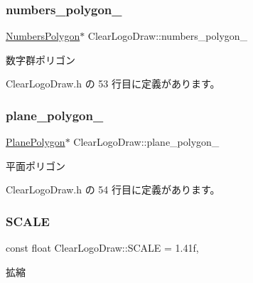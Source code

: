 \subsubsection{\texorpdfstring{numbers\+\_\+polygon\+\_\+}{numbers\_polygon\_}}
{\footnotesize\ttfamily \mbox{\hyperlink{class_numbers_polygon}{Numbers\+Polygon}}$\ast$ Clear\+Logo\+Draw\+::numbers\+\_\+polygon\+\_\+\hspace{0.3cm}{\ttfamily [private]}}



数字群ポリゴン 



 Clear\+Logo\+Draw.\+h の 53 行目に定義があります。

\mbox{\label{class_clear_logo_draw_a8d5fe46bbb3bf445ca322555853cf60a}} 
\subsubsection{\texorpdfstring{plane\+\_\+polygon\+\_\+}{plane\_polygon\_}}
{\footnotesize\ttfamily \mbox{\hyperlink{class_plane_polygon}{Plane\+Polygon}}$\ast$ Clear\+Logo\+Draw\+::plane\+\_\+polygon\+\_\+\hspace{0.3cm}{\ttfamily [private]}}



平面ポリゴン 



 Clear\+Logo\+Draw.\+h の 54 行目に定義があります。

\mbox{\label{class_clear_logo_draw_afdf263982add6dd6b8ac167b3ef44dc0}} 
\subsubsection{\texorpdfstring{S\+C\+A\+LE}{SCALE}}
{\footnotesize\ttfamily const float Clear\+Logo\+Draw\+::\+S\+C\+A\+LE = 1.\+41f\hspace{0.3cm}{\ttfamily [static]}, {\ttfamily [private]}}



拡縮 



